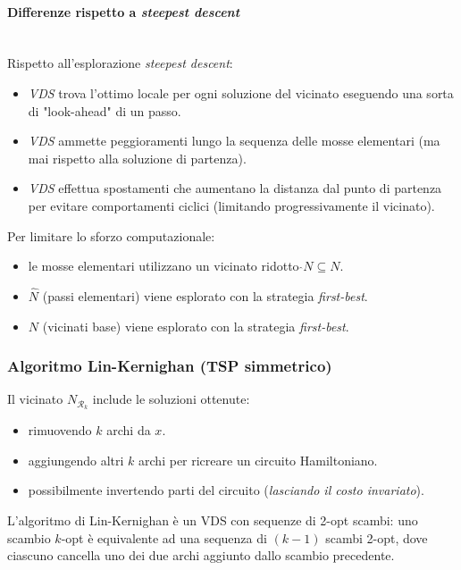 \documentclass{article}
\begin{document}
\paragraph{Differenze rispetto a \textit{steepest descent}}\mbox{}\\
Rispetto all'esplorazione \textit{steepest descent}:
\begin{itemize}
    \item \textit{VDS} trova l'ottimo locale per ogni soluzione del vicinato
    eseguendo una sorta di "look-ahead" di un passo.
    \item \textit{VDS} ammette peggioramenti lungo la sequenza delle mosse
    elementari (ma mai rispetto alla soluzione di partenza).
    \item \textit{VDS} effettua spostamenti che aumentano la distanza dal
    punto di partenza per evitare comportamenti ciclici (limitando progressivamente
    il vicinato).
\end{itemize}
Per limitare lo sforzo computazionale:
\begin{itemize}
    \item le mosse elementari utilizzano un vicinato ridotto $\hat{}N\subseteq N$.
    \item $\hat{N}$ (passi elementari) viene esplorato con la strategia \textit{first-best}.
    \item $N$ (vicinati base) viene esplorato con la strategia \textit{first-best}.
\end{itemize}

\subsubsection{Algoritmo Lin-Kernighan (TSP simmetrico)}
Il vicinato $N_{\mathcal{R}_k}$ include le soluzioni ottenute:
\begin{itemize}
    \item rimuovendo $k$ archi da $x$.
    \item aggiungendo altri $k$ archi per ricreare un circuito Hamiltoniano.
    \item possibilmente invertendo parti del circuito (\textit{lasciando il costo invariato}).
\end{itemize}
L'algoritmo di Lin-Kernighan è un VDS con sequenze di 2-opt scambi: uno scambio
$k$-opt è equivalente ad una sequenza di $(k-1)$ scambi 2-opt, dove ciascuno
cancella uno dei due archi aggiunto dallo scambio precedente.
\end{document}
